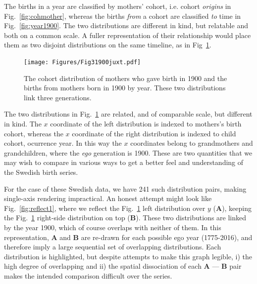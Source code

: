 \documentclass{article}
\begin{document}
The births in a year are classified by mothers' cohort, i.e. cohort \emph{origins} in Fig.~\ref{fig:cohmother}, whereas the births \emph{from} a cohort are classified \emph{to} time in Fig.~\ref{fig:year1900}. The two distributions are different in kind, but relatable and both on a common scale. A fuller representation of their relationship would place them as two disjoint distributions on the same timeline, as in Fig~\ref{fig:juxt}.

\begin{figure}[ht!]
 \centering
        \texttt{[image: Figures/Fig31900juxt.pdf]}
        \caption{The cohort distribution of mothers who gave birth in 1900 and the births from mothers born in 1900 by year. These two distributions link three generations.}
          \label{fig:juxt}
\end{figure}

The two distributions in Fig.~\ref{fig:juxt} are related, and of comparable scale, but different in kind. The $x$ coordinate of the left distribution is indexed to mothers's birth cohort, whereas the $x$ coordinate of the right distribution is indexed to child cohort, ocurrence year. In this way the $x$ coordinates belong to grandmothers and grandchildren, where the \emph{ego} generation is 1900. These are two quantities that we may wish to compare in various ways to get a better feel and understanding of the Swedish birth series. 

For the case of these Swedish data, we have 241 such distribution pairs, making single-axis rendering impractical. An honest attempt might look like Fig.~\ref{fig:reflect1}, where we reflect the Fig.~\ref{fig:juxt} left distribution over $y$ (\textbf{A}), keeping the Fig.~\ref{fig:juxt} right-side distribution on top (\textbf{B}). These two distributions are linked by the year 1900, which of course overlaps with neither of them. In this representation, \textbf{A} and \textbf{B} are re-drawn for each possible ego year (1775-2016), and therefore imply a large sequential set of overlapping distributions. Each  distribution is highlighted, but despite attempts to make this graph legible, i) the high degree of overlapping and ii) the spatial dissociation of each \textbf{A} --- \textbf{B} pair makes the intended comparison difficult over the series.
\end{document}
